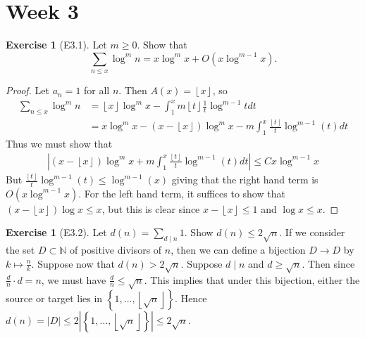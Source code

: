 \documentclass[reqno]{amsart}
\theoremstyle{definition}
\newtheorem{exercise}[theorem]{Exercise}
\theoremstyle{remark}
\begin{document}
\section{Week 3}

\begin{exercise}[E3.1]
    Let $m \ge 0$. Show that
    \[
    \sum_{n \le x} \log^{m} n = 
    x \log^{m} x + O \left( x \log^{m-1} x \right) .
    \] 
\end{exercise}

\begin{proof}
    Let $a_n = 1$ for all $n$. Then
    $A(x) = \left\lfloor x \right\rfloor$, so
    \begin{align*}
    \sum_{n \le x} \log^{m}n 
    &= 
    \left\lfloor x \right\rfloor \log^{m} x
    - \int_{1}^{x} m \left\lfloor t \right\rfloor \frac{1}{t}
    \log^{m-1} t dt\\
    &= x \log^{m}x
    - \left( x - \left\lfloor x \right\rfloor  \right) \log^{m} x
    -m \int_{1}^{x} \frac{\left\lfloor  t \right\rfloor }{t}
    \log^{m-1}(t) dt
    \end{align*}
    Thus we must show that
    \begin{align*}
    \left| \left( x - \left\lfloor x \right\rfloor  \right) \log^{m} x
    +m \int_{1}^{x} \frac{\left\lfloor  t \right\rfloor }{t}
    \log^{m-1}(t) dt  \right| \le 
    C x \log^{m-1}x
    \end{align*}
    But $\frac{\left\lfloor  t \right\rfloor }{t}
    \log^{m-1} (t) \le \log^{m-1}(x)$ giving that
    the right hand term is $O\left( x \log^{m-1} x \right) $.
    For the left hand term,
    it suffices to show that
    $\left( x - \left\lfloor x  \right\rfloor  \right) 
    \log x \le x$, but this is clear
    since $x - \left\lfloor x \right\rfloor \le 1$ and
    $ \log x  \le x$.
\end{proof}

\begin{exercise}[E3.2]
    Let $d(n) = \sum_{d  \mid n} 1$. Show
    $d(n) \le 2 \sqrt{n} $.
    If we consider the set $D \subset \mathbb{N} $ of positive
    divisors of $n$, then we can define a bijection
    $D \to D$ by
    $k \mapsto \frac{n}{k}$. Suppose
    now that $d(n) > 2 \sqrt{n} $. 
    Suppose $d  \mid n$ and
    $d \ge  \sqrt{n} $. Then
    since $\frac{d}{n} \cdot d = n$, we must have
    $\frac{d}{n} \le  \sqrt{n} $. This implies that
    under this bijection, either the source or
    target lies in
    $\left\{ 1,\ldots, \left\lfloor \sqrt{n}  \right\rfloor \right\} $.
    Hence $d(n) = \left| D \right| \le 
    2 \left| \left\{ 1, \ldots,
    \left\lfloor \sqrt{n}  \right\rfloor \right\}  \right| 
    \le 2 \sqrt{n} $.
\end{exercise}
\end{document}
